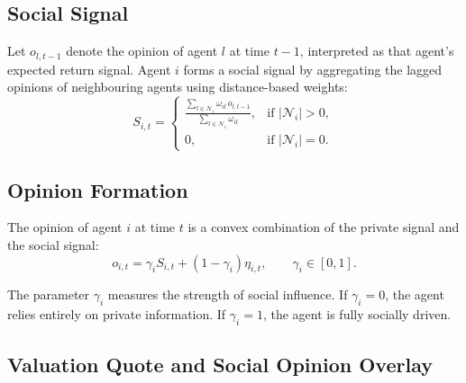 \documentclass[12pt, a4paper]{article}
\begin{document}
    \subsection{Social Signal}

    Let \(o_{l,t-1}\) denote the opinion of agent \(l\) at time \(t-1\),
    interpreted as that agent's expected return signal. Agent \(i\) forms a social
    signal by aggregating the lagged opinions of neighbouring agents using
    distance-based weights:
    \begin{equation}
        S_{i,t}=
        \begin{cases}
            \displaystyle
            \frac{\sum_{l \in \mathcal{N}_i} \omega_{il} \, o_{l,t-1}}{\sum_{l \in \mathcal{N}_i} \omega_{il}}, & \text{if } |\mathcal{N}_i|>0,\\
            0, & \text{if } |\mathcal{N}_i|=0.
        \end{cases}
    \end{equation}

    \subsection{Opinion Formation}

    The opinion of agent \(i\) at time \(t\) is a convex combination of the
    private signal and the social signal:
    \begin{equation}
        o_{i,t} = \gamma_i S_{i,t} + (1-\gamma_i)\eta_{i,t},
        \qquad \gamma_i \in [0,1].
    \end{equation}

    The parameter \(\gamma_i\) measures the strength of social influence. If
    \(\gamma_i=0\), the agent relies entirely on private information. If
    \(\gamma_i=1\), the agent is fully socially driven.

    \subsection{Valuation Quote and Social Opinion Overlay}
\end{document}
